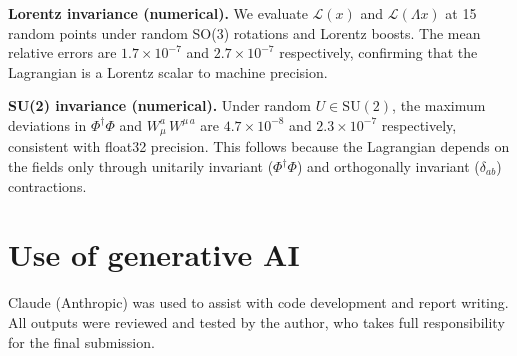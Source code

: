 \documentclass[10pt,leqno]{amsart}
\begin{document}
\textbf{Lorentz invariance (numerical).}
We evaluate $\mathcal{L}(x)$ and $\mathcal{L}(\Lambda x)$ at 15 random
points under random SO(3) rotations and Lorentz boosts. The mean relative
errors are $1.7 \times 10^{-7}$ and $2.7 \times 10^{-7}$ respectively, 
confirming that the Lagrangian is a Lorentz scalar to machine precision.

\textbf{SU(2) invariance (numerical).}
Under random $U \in \mathrm{SU}(2)$, the maximum deviations in
$\Phi^\dagger\Phi$ and $W_\mu^a\,W^{\mu\,a}$ are
$4.7 \times 10^{-8}$ and $2.3 \times 10^{-7}$ respectively, consistent
with float32 precision. This follows because the Lagrangian depends on
the fields only through unitarily invariant ($\Phi^\dagger\Phi$) and
orthogonally invariant ($\delta_{ab}$) contractions.

\section*{Use of generative AI}
Claude (Anthropic) was used to assist with code development and
report writing. All outputs were reviewed and tested by the author,
who takes full responsibility for the final submission.



\end{document}
